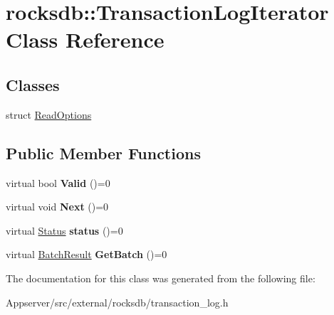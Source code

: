 \hypertarget{classrocksdb_1_1TransactionLogIterator}{}\section{rocksdb\+:\+:Transaction\+Log\+Iterator Class Reference}
\label{classrocksdb_1_1TransactionLogIterator}
\subsection*{Classes}
\begin{DoxyCompactItemize}
\item 
struct \hyperlink{structrocksdb_1_1TransactionLogIterator_1_1ReadOptions}{Read\+Options}
\end{DoxyCompactItemize}
\subsection*{Public Member Functions}
\begin{DoxyCompactItemize}
\item 
virtual bool {\bfseries Valid} ()=0\hypertarget{classrocksdb_1_1TransactionLogIterator_abf49d190ae6319233225f904a75ee916}{}\label{classrocksdb_1_1TransactionLogIterator_abf49d190ae6319233225f904a75ee916}

\item 
virtual void {\bfseries Next} ()=0\hypertarget{classrocksdb_1_1TransactionLogIterator_a6055689c7f0fa7f87fc5be036eb2a00e}{}\label{classrocksdb_1_1TransactionLogIterator_a6055689c7f0fa7f87fc5be036eb2a00e}

\item 
virtual \hyperlink{classrocksdb_1_1Status}{Status} {\bfseries status} ()=0\hypertarget{classrocksdb_1_1TransactionLogIterator_a5ec1a9b846562af9b5ac775b3855d654}{}\label{classrocksdb_1_1TransactionLogIterator_a5ec1a9b846562af9b5ac775b3855d654}

\item 
virtual \hyperlink{structrocksdb_1_1BatchResult}{Batch\+Result} {\bfseries Get\+Batch} ()=0\hypertarget{classrocksdb_1_1TransactionLogIterator_a10bcfd9c9a00bdd7e5fd80e765ec8242}{}\label{classrocksdb_1_1TransactionLogIterator_a10bcfd9c9a00bdd7e5fd80e765ec8242}

\end{DoxyCompactItemize}


The documentation for this class was generated from the following file\+:\begin{DoxyCompactItemize}
\item 
Appserver/src/external/rocksdb/transaction\+\_\+log.\+h\end{DoxyCompactItemize}
